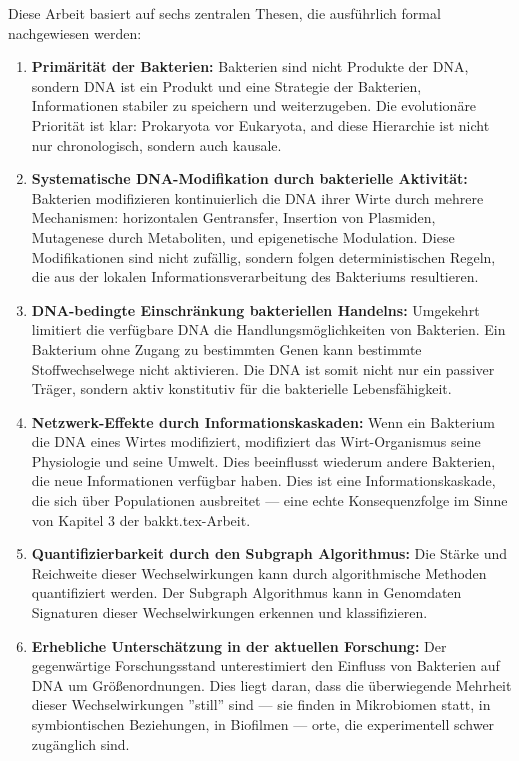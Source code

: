 \documentclass[a4paper,12pt]{article}
\theoremstyle{definition}
\begin{document}
Diese Arbeit basiert auf sechs zentralen Thesen, die ausführlich formal nachgewiesen werden:

\begin{enumerate}
    \item \textbf{Primärität der Bakterien:} Bakterien sind nicht Produkte der DNA, sondern DNA ist ein Produkt und eine Strategie der Bakterien, Informationen stabiler zu speichern und weiterzugeben. Die evolutionäre Priorität ist klar: Prokaryota vor Eukaryota, and diese Hierarchie ist nicht nur chronologisch, sondern auch kausale.
    
    \item \textbf{Systematische DNA-Modifikation durch bakterielle Aktivität:} Bakterien modifizieren kontinuierlich die DNA ihrer Wirte durch mehrere Mechanismen: horizontalen Gentransfer, Insertion von Plasmiden, Mutagenese durch Metaboliten, und epigenetische Modulation. Diese Modifikationen sind nicht zufällig, sondern folgen deterministischen Regeln, die aus der lokalen Informationsverarbeitung des Bakteriums resultieren.
    
    \item \textbf{DNA-bedingte Einschränkung bakteriellen Handelns:} Umgekehrt limitiert die verfügbare DNA die Handlungsmöglichkeiten von Bakterien. Ein Bakterium ohne Zugang zu bestimmten Genen kann bestimmte Stoffwechselwege nicht aktivieren. Die DNA ist somit nicht nur ein passiver Träger, sondern aktiv konstitutiv für die bakterielle Lebensfähigkeit.
    
    \item \textbf{Netzwerk-Effekte durch Informationskaskaden:} Wenn ein Bakterium die DNA eines Wirtes modifiziert, modifiziert das Wirt-Organismus seine Physiologie und seine Umwelt. Dies beeinflusst wiederum andere Bakterien, die neue Informationen verfügbar haben. Dies ist eine Informationskaskade, die sich über Populationen ausbreitet --- eine echte Konsequenzfolge im Sinne von Kapitel 3 der bakkt.tex-Arbeit.
    
    \item \textbf{Quantifizierbarkeit durch den Subgraph Algorithmus:} Die Stärke und Reichweite dieser Wechselwirkungen kann durch algorithmische Methoden quantifiziert werden. Der Subgraph Algorithmus kann in Genomdaten Signaturen dieser Wechselwirkungen erkennen und klassifizieren.
    
    \item \textbf{Erhebliche Unterschätzung in der aktuellen Forschung:} Der gegenwärtige Forschungsstand unterestimiert den Einfluss von Bakterien auf DNA um Größenordnungen. Dies liegt daran, dass die überwiegende Mehrheit dieser Wechselwirkungen ''still'' sind --- sie finden in Mikrobiomen statt, in symbiontischen Beziehungen, in Biofilmen --- orte, die experimentell schwer zugänglich sind.
\end{enumerate}
\end{document}
